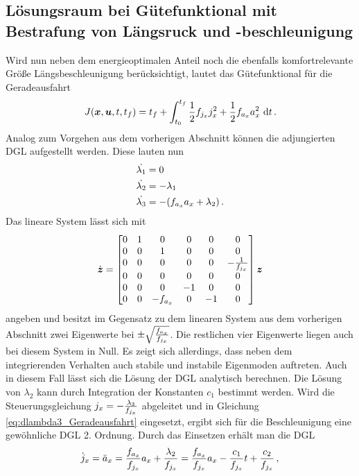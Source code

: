 \subsection{Lösungsraum bei Gütefunktional mit Bestrafung von Längsruck und -beschleunigung}
Wird nun neben dem energieoptimalen Anteil noch die ebenfalls komfortrelevante Größe Längsbeschleunigung berücksichtigt, lautet das Gütefunktional für die Geradeausfahrt 
\begin{equation}
J(\boldsymbol{x},\boldsymbol{u},t,t_f) = t_f + \int_{t_0}^{t_f}\frac{1}{2}f_{j_x} j_x^2 + \frac{1}{2}f_{a_x} a_x^2~\textrm{d}{t}\,.
\end{equation}
Analog zum Vorgehen aus dem vorherigen Abschnitt können die adjungierten \gls{DGL} aufgestellt werden. Diese lauten nun
\begin{align}
\dot{\lambda_1} &= 0 \\
\dot{\lambda_2} &= -\lambda_1 \\
\dot{\lambda_3} &= -(f_{a_x} a_x + \lambda_2)\,. \label{eq:dlambda3_Geradeausfahrt}
\end{align}
Das lineare System lässt sich mit \begin{equation}
\dot{\boldsymbol{z}} = \begin{bmatrix}
0 & 1 & 0 & 0 & 0 & 0 \\
0 & 0 & 1 & 0 & 0 & 0 \\
0 & 0 & 0 & 0 & 0 & -\frac{1}{f_{j_x}} \\
0 & 0 & 0 & 0 & 0 & 0 \\
0 & 0 & 0 & -1 & 0 & 0 \\
0 & 0 & -f_{a_x} & 0 & -1 & 0 \\
\end{bmatrix}\boldsymbol{z}
\end{equation}
angeben und besitzt im Gegensatz zu dem linearen System aus dem vorherigen Abschnitt zwei Eigenwerte bei $\pm\sqrt{\frac{f_{a_x}}{f_{j_x}}}$. Die restlichen vier Eigenwerte liegen auch bei diesem System in Null. Es zeigt sich allerdings, dass neben dem integrierenden Verhalten auch stabile und instabile Eigenmoden auftreten. Auch in diesem Fall lässt sich die Lösung der \gls{DGL} analytisch berechnen. Die Lösung von $\lambda_2$ kann durch Integration der Konstanten $c_1$ bestimmt werden. Wird die Steuerungsgleichung $j_x = -\frac{\lambda_3}{f_{j_x}}$ abgeleitet und in Gleichung \eqref{eq:dlambda3_Geradeausfahrt} eingesetzt, ergibt sich für die Beschleunigung eine gewöhnliche \gls{DGL} 2. Ordnung. Durch das Einsetzen erhält man die \gls{DGL}
\begin{equation}
\dot{j}_x = \ddot{a}_x = \frac{f_{a_x}}{f_{j_x}}a_x + \frac{\lambda_2}{f_{j_x}} = \frac{f_{a_x}}{f_{j_x}}a_x - \frac{c_1}{f_{j_x}}t + \frac{c_2}{f_{j_x}} \,, \label{eq:DGL_ax}
\end{equation}
